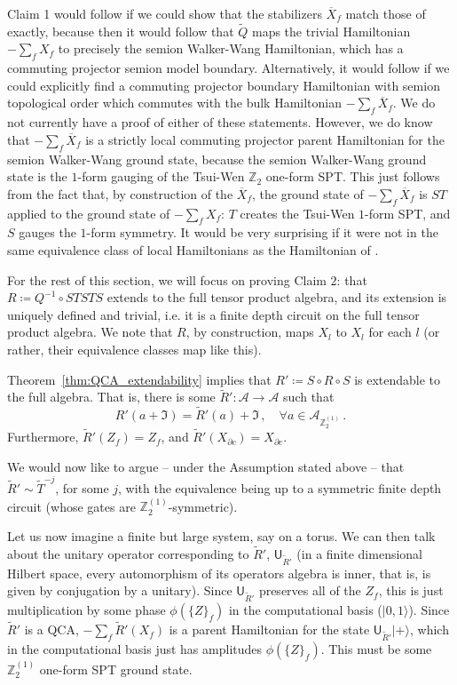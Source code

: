 \documentclass[aps,twocolumn,prx,floatfix,preprintnumbers, nofootinbib,10pt]{revtex4-2}
\numberwithin{equation}{section}
\theoremstyle{definition}
\theoremstyle{remark}
\theoremstyle{claim}
\newcommand{\be}{\begin{equation}}
\newcommand{\ee}{\end{equation}}
\newcommand{\Z}{{\mathbb Z}}
\def\ket#1{{|{#1}\rangle}}
\newcommand{\mc}[1]{\mathcal{#1}}
\renewcommand{\sf}[1]{\mathsf{#1}}
\begin{document}
Claim 1 would follow if we could show that the stabilizers ${\overline{X}}_f$ match those of \cite{Shirley_2022} exactly, because then it would follow that $\tilde{Q}$ maps the trivial Hamiltonian $-\sum_f X_f$ to precisely the semion Walker-Wang Hamiltonian, which has a commuting projector semion model boundary.  Alternatively, it would follow if we could explicitly find a commuting projector boundary Hamiltonian with semion topological order which commutes with the bulk Hamiltonian $-\sum_f {\overline{X}}_f$.  We do not currently have a proof of either of these statements.  However, we do know that $-\sum_f {\overline{X}}_f$ is a strictly local commuting projector parent Hamiltonian for the semion Walker-Wang ground state, because the semion Walker-Wang ground state is the $1$-form gauging of the Tsui-Wen $\Z_2$ one-form SPT.  This just follows from the fact that, by construction of the ${\overline{X}}_f$, the ground state of $-\sum_f {\overline{X}}_f$ is $ST$ applied to the ground state of $-\sum_f X_f$: $T$ creates the Tsui-Wen $1$-form SPT, and $S$ gauges the $1$-form symmetry.  It would be very surprising if it were not in the same equivalence class of local Hamiltonians as the Hamiltonian of \cite{Shirley_2022}.

For the rest of this section, we will focus on proving Claim $2$: that $R \coloneqq Q^{-1} \circ STSTS$ extends to the full tensor product algebra, and its extension is uniquely defined and trivial, i.e. it is a finite depth circuit on the full tensor product algebra. We note that $R$, by construction, maps $X_l$ to $X_l$ for each $l$ (or rather, their equivalence classes map like this).

Theorem~\ref{thm:QCA_extendability} implies that $R' \coloneqq S \circ R \circ S$ is extendable to the full algebra. That is, there is some $\tilde{R}' : \mc{A} \rightarrow \mc{A}$ such that
\be
R'(a + \mathfrak{I}) = \tilde{R}'(a) + \mathfrak{I} \,, \quad \forall a \in \mc{A}_{\Z_2^{(1)}} \,.
\ee
Furthermore, $\tilde{R}'(Z_f) = Z_f$, and $\tilde{R}'(X_{\partial c}) = X_{\partial c}$.


We would now like to argue -- under the Assumption stated above -- that $\tilde{R}' \sim \tilde{T}^{-j}$, for some $j$, with the equivalence being up to a symmetric finite depth circuit (whose gates are $\Z_2^{(1)}$-symmetric).  

Let us now imagine a finite but large system, say on a torus. We can then talk about the unitary operator corresponding to $\tilde{R}'$, $\sf{U}_{\tilde{R}'}$ (in a finite dimensional Hilbert space, every automorphism of its operators algebra is inner, that is, is given by conjugation by a unitary). Since $\sf{U}_{\tilde{R}'}$ preserves all of the $Z_f$, this is just multiplication by some phase $\phi(\{Z\}_f)$ in the computational basis ($\ket{0, 1}$). Since $\tilde{R}'$ is a QCA, $-\sum_f \tilde{R}'(X_f)$ is a parent Hamiltonian for the state $\sf{U}_{\tilde{R}'}\ket{+}$, which in the computational basis just has amplitudes $\phi(\{Z\}_f)$. This must be some $\Z_2^{(1)}$ one-form SPT ground state.
\end{document}
